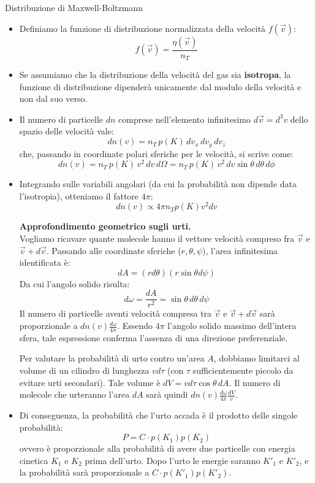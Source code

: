 \documentclass[openany,a4paper,12pt]{book}
\theoremstyle{remark}
\begin{document}
\begin{bressan}{Distribuzione di Maxwell-Boltzmann}
\begin{itemize}
    \item Definiamo la funzione di distribuzione normalizzata della velocità $f(\vec{v})$: 
    \[ f(\vec{v})=\frac{\eta (\vec{v})}{n_T} \]
    
    \item Se assumiamo che la distribuzione della velocità del gas sia \textbf{isotropa}, la funzione di distribuzione dipenderà unicamente dal modulo della velocità e non dal suo verso.
    
    \item Il numero di particelle $dn$ comprese nell'elemento infinitesimo $d\vec{v} = d^3v$ dello spazio delle velocità vale:
    \[
        dn(v) = n_T \, p(K) \, dv_x \, dv_y \, dv_z
    \]
    che, passando in coordinate polari sferiche per le velocità, si scrive come:
    \[
        dn(v) = n_T \, p(K) \, v^2 \, dv \, d\Omega = n_T \, p(K) \, v^2 \, dv \sin\theta \, d\theta \, d\phi
    \]
    
    \item Integrando sulle variabili angolari (da cui la probabilità non dipende data l'isotropia), otteniamo il fattore $4\pi$:
    \[
        dn(v) \propto 4 \pi n_T p(K) v^2 dv 
    \]

    \begin{nota}
        \textbf{Approfondimento geometrico sugli urti.}\\
        Vogliamo ricavare quante molecole hanno il vettore velocità compreso fra $\vec{v}$ e $\vec{v}+d\vec{v}$. Passando alle coordinate sferiche ($r, \theta, \psi$), l'area infinitesima identificata è:
        \[
        dA = (r d\theta)(r \sin\theta d\psi)
        \]
        Da cui l'angolo solido risulta:
        \[
        d\omega = \frac{dA}{r^2} = \sin\theta \, d\theta \, d\psi
        \]
        Il numero di particelle aventi velocità compresa tra $\vec{v}$ e $\vec{v}+d\vec{v}$ sarà proporzionale a $dn(v)\frac{d\omega}{4\pi}$. Essendo $4\pi$ l'angolo solido massimo dell'intera sfera, tale espressione conferma l'assenza di una direzione preferenziale.
        
        Per valutare la probabilità di urto contro un'area $A$, dobbiamo limitarci al volume di un cilindro di lunghezza $v d\tau$ (con $\tau$ sufficientemente piccolo da evitare urti secondari). Tale volume è $dV = v d\tau \cos\theta \, dA$. Il numero di molecole che urteranno l'area $dA$ sarà quindi $dn(v)\frac{d\omega}{4\pi}\frac{dV}{v}$.
    \end{nota}

    \item Di conseguenza, la probabilità che l'urto accada è il prodotto delle singole probabilità: 
    \[P=C \cdot p(K_1)p(K_2)\] 
    ovvero è proporzionale alla probabilità di avere due particelle con energia cinetica $K_1$ e $K_2$ prima dell'urto. Dopo l'urto le energie saranno $K'_1$ e $K'_2$, e la probabilità sarà proporzionale a $C \cdot p(K'_1)p(K'_2)$.
    

\end{itemize}
\end{bressan}
\end{document}
